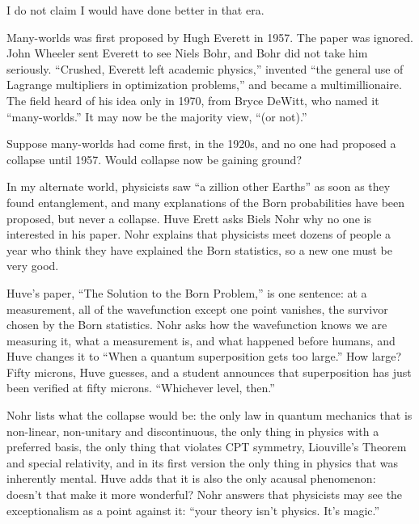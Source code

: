 
I do not claim I would have done better in that era.

Many-worlds was first proposed by Hugh Everett in 1957. The paper was ignored. John Wheeler sent Everett to see Niels Bohr, and Bohr did not take him seriously. ``Crushed, Everett left academic physics,'' invented ``the general use of Lagrange multipliers in optimization problems,'' and became a multimillionaire.  The field heard of his idea only in 1970, from Bryce DeWitt, who named it ``many-worlds.'' It may now be the majority view, ``(or not).'' 

Suppose many-worlds had come first, in the 1920s, and no one had proposed a collapse until 1957. Would collapse now be gaining ground?

In my alternate world, physicists saw ``a zillion other Earths'' as soon as they found entanglement, and many explanations of the Born probabilities have been proposed, but never a collapse. Huve Erett asks Biels Nohr why no one is interested in his paper. Nohr explains that physicists meet dozens of people a year who think they have explained the Born statistics, so a new one must be very good.

Huve's paper, ``The Solution to the Born Problem,'' is one sentence: at a measurement, all of the wavefunction except one point vanishes, the survivor chosen by the Born statistics. Nohr asks how the wavefunction knows we are measuring it, what a measurement is, and what happened before humans, and Huve changes it to ``When a quantum superposition gets too large.'' How large? Fifty microns, Huve guesses, and a student announces that superposition has just been verified at fifty microns. ``Whichever level, then.''

Nohr lists what the collapse would be: the only law in quantum mechanics that is non-linear, non-unitary and discontinuous, the only thing in physics with a preferred basis, the only thing that violates CPT symmetry, Liouville's Theorem and special relativity, and in its first version the only thing in physics that was inherently mental. Huve adds that it is also the only acausal phenomenon: doesn't that make it more wonderful? Nohr answers that physicists may see the exceptionalism as a point against it: ``your theory isn't physics. It's magic.'' 

